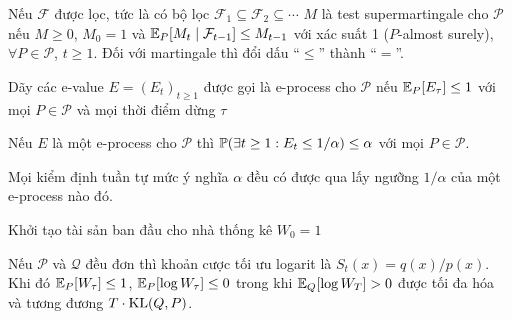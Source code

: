 \begin{frame}
  \begin{defn}
    Nếu $\mathcal{F}$ được lọc, tức là có bộ lọc $\mathcal{F}_1 \subseteq
    \mathcal{F}_2 \subseteq \dotsb$ $M$ là test supermartingale cho
    $\mathcal{P}$ nếu $M \ge 0$, $M_0 = 1$ và $\operatorname{\mathbb{E}}_P[M_t\mid \mathcal{F}_{t
    - 1}] \le M_{t - 1}$ với xác suất 1 ($P$-almost surely), $\forall P \in
    \mathcal{P}$, $t \ge 1$. Đối với martingale thì đổi dấu ``$\le$'' thành
    ``$=$''.
  \end{defn}

  \begin{defn}
    Dãy các e-value $E = (E_t)_{t \ge 1}$ được gọi là e-process cho
    $\mathcal{P}$ nếu $\operatorname{\mathbb{E}}_P[E_\tau] \le 1$ với mọi $P \in \mathcal{P}$ và
    mọi thời điểm dừng $\tau$
  \end{defn}

  \begin{thm}
    Nếu $E$ là một e-process cho $\mathcal{P}$ thì $\operatorname{\mathbb{P}}(\exists t \ge 1 : E_t
    \le 1/\alpha) \le \alpha$ với mọi $P \in \mathcal{P}$.
  \end{thm}

  \begin{thm}
    Mọi kiểm định tuần tự mức ý nghĩa $\alpha$ đều có được qua lấy ngưỡng
    $1/\alpha$ của một e-process nào đó.
  \end{thm}
\end{frame}

\begin{frame}
  \begin{algorithm}[H]
    \caption{Kiểm định qua cá cược: trường hợp $P$ đơn}
    Khởi tạo tài sản ban đầu cho nhà thống kê $W_0 = 1$\;
  \end{algorithm}

  Nếu $\mathcal{P}$ và $\mathcal{Q}$ đều đơn thì khoản cược tối ưu logarit là
  $S_t(x) = q(x) / p(x)$. Khi đó $\operatorname{\mathbb{E}}_P[W_\tau] \le 1$,
  $\operatorname{\mathbb{E}}_P[\log W_\tau] \le 0$ trong khi $\operatorname{\mathbb{E}}_Q[\log W_T] > 0$ được tối
  đa hóa và tương đương $T \cdot \operatorname{KL}(Q, P)$.
\end{frame}

